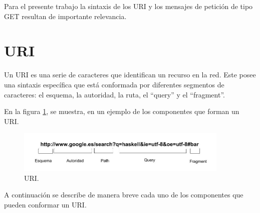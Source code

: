 Para el presente trabajo la sintaxis de los URI y los mensajes de petición de tipo GET resultan de importante relevancia.

\section{URI} \label{URIsection}

Un URI es una serie de caracteres que identifican un recurso en la red. Este posee una sintaxis específica que está conformada por diferentes segmentos de caracteres: el esquema, la autoridad, la ruta, el ``query'' y el ``fragment''.

En la figura \ref{fig:URI}, se muestra, en un ejemplo de los componentes que forman un URI.

\begin{figure}[tb]
\begin{center}
\includegraphics[width=4in]{./img/URI.jpg}
\caption{URI.}
\label{fig:URI}
\end{center}
\end{figure}

A continuaci\'on se describe de manera breve cada uno de los componentes que pueden conformar un URI.

